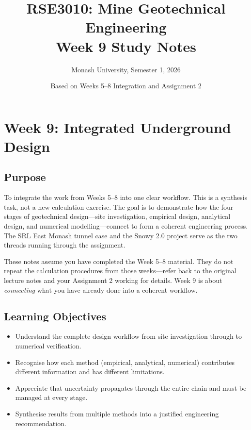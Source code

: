 \documentclass[a4paper,12pt]{article}
\title{\textbf{RSE3010: Mine Geotechnical Engineering} \\ Week 9 Study Notes}
\author{Monash University, Semester 1, 2026}
\date{Based on Weeks 5--8 Integration and Assignment 2}
\begin{document}
\maketitle

\section{Week 9: Integrated Underground Design}

\subsection{Purpose}
To integrate the work from Weeks 5--8 into one clear workflow. This is a synthesis task, not a new calculation exercise. The goal is to demonstrate how the four stages of geotechnical design---site investigation, empirical design, analytical design, and numerical modelling---connect to form a coherent engineering process. The SRL East Monash tunnel case and the Snowy 2.0 project serve as the two threads running through the assignment.

\begin{notebox}
These notes assume you have completed the Week 5--8 material. They do not repeat the calculation procedures from those weeks---refer back to the original lecture notes and your Assignment 2 working for details. Week 9 is about \textit{connecting} what you have already done into a coherent workflow.
\end{notebox}

\subsection{Learning Objectives}
\begin{itemize}
    \item Understand the complete design workflow from site investigation through to numerical verification.
    \item Recognise how each method (empirical, analytical, numerical) contributes different information and has different limitations.
    \item Appreciate that uncertainty propagates through the entire chain and must be managed at every stage.
    \item Synthesise results from multiple methods into a justified engineering recommendation.
\end{itemize}
\end{document}
